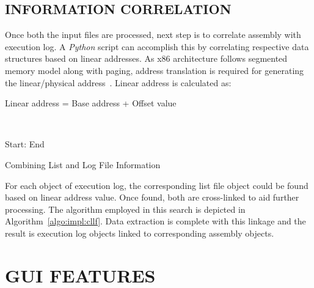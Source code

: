 \subsection {INFORMATION CORRELATION}

Once both the input files are processed, next step is to correlate assembly with execution log. A {\it Python} script can accomplish this by correlating respective data structures based on linear addresses. As x86 architecture follows segmented memory model along with paging, address translation is required for generating the linear/physical address~\citep{SS:AMD64-V2}. Linear address is calculated as:
\\
\centerline{Linear address = Base address + Offset value}
\\



\IncMargin{1em}
\begin{algorithm}[h]
\DontPrintSemicolon
{} 

\BlankLine
Start: \;
End \;
\caption{Combining List and Log File Information}
\label{algo:impl:cllf}
\end{algorithm}\DecMargin{1em}


For each object of execution log, the corresponding list file object could be found based on linear address value. Once found, both are cross-linked to aid further processing. The algorithm employed in this search is depicted in Algorithm~\ref{algo:impl:cllf}. Data extraction is complete with this linkage and the result is execution log objects linked to corresponding assembly objects.

\section {GUI FEATURES}

